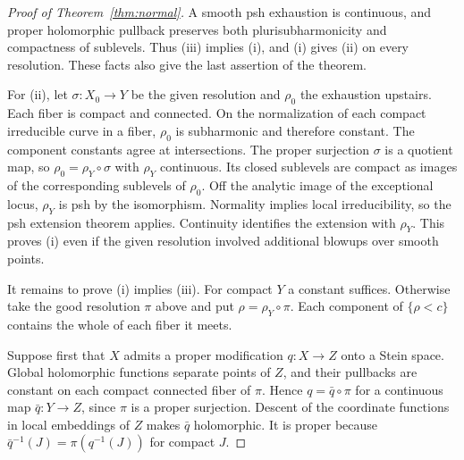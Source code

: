 \documentclass[11pt]{amsart}
\theoremstyle{remark}
\numberwithin{equation}{section}
\begin{document}
\begin{proof}[Proof of Theorem~\ref{thm:normal}]
A smooth psh exhaustion is continuous, and proper holomorphic
pullback preserves both plurisubharmonicity and compactness of
sublevels. Thus \textup{(iii)} implies \textup{(i)}, and
\textup{(i)} gives \textup{(ii)} on every resolution. These facts
also give the last assertion of the theorem.

For \textup{(ii)}, let \(\sigma:X_0\to Y\) be the given resolution
and \(\rho_0\) the exhaustion upstairs. Each fiber is compact and
connected. On the normalization of each compact irreducible curve
in a fiber, \(\rho_0\) is subharmonic and therefore constant. The
component constants agree at intersections. The proper surjection
\(\sigma\) is a quotient map, so \(\rho_0=\rho_Y\circ\sigma\) with
\(\rho_Y\) continuous. Its closed sublevels are compact as images of
the corresponding sublevels of \(\rho_0\). Off the analytic image
of the exceptional locus, \(\rho_Y\) is psh by the isomorphism.
Normality implies local irreducibility, so the psh extension theorem
\cite[Th\'eor\`eme~1.7]{Demailly} applies. Continuity identifies
the extension with \(\rho_Y\). This proves \textup{(i)} even if the
given resolution involved additional blowups over smooth points.

It remains to prove \textup{(i)} implies \textup{(iii)}. For compact
\(Y\) a constant suffices. Otherwise take the good resolution \(\pi\)
above and put \(\rho=\rho_Y\circ\pi\). Each component of
\(\{\rho<c\}\) contains the whole of each fiber it meets.

Suppose first that \(X\) admits a proper modification \(q:X\to Z\)
onto a Stein space. Global holomorphic functions separate points of
\(Z\), and their pullbacks are constant on each compact connected
fiber of \(\pi\). Hence \(q=\bar q\circ\pi\) for a continuous map
\(\bar q:Y\to Z\), since \(\pi\) is a proper surjection. Descent of
the coordinate functions in local embeddings of \(Z\) makes \(\bar q\)
holomorphic. It is proper because
\(\bar q^{-1}(J)=\pi(q^{-1}(J))\) for compact \(J\).


\end{proof}
\end{document}
